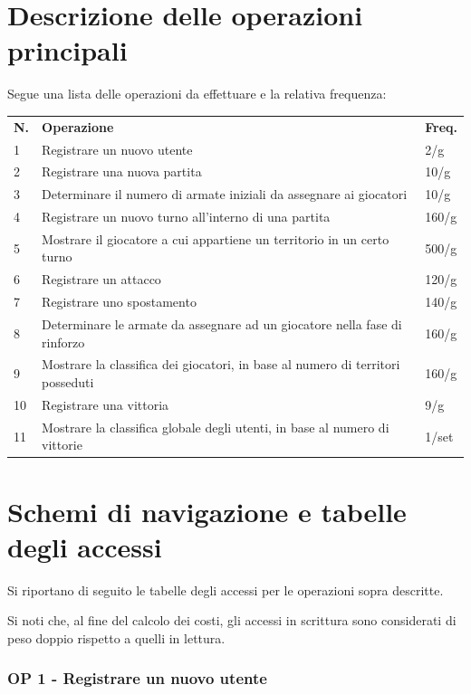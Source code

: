 \documentclass[a4paper,12pt]{report}
\begin{document}
\section{Descrizione delle operazioni principali}

Segue una lista delle operazioni da effettuare e la relativa frequenza:

\begin{table}[htbp]
    \begin{tabular}{lll}
        \rowcolor{lime!50} 
        \textbf{N.} & \textbf{Operazione} & \textbf{Freq.} \\
        1 & Registrare un nuovo utente & 2/g \\ 
        2 & Registrare una nuova partita & 10/g \\ 
        3 & Determinare il numero di armate iniziali da assegnare ai giocatori & 10/g \\ 
        4 & Registrare un nuovo turno all'interno di una partita & 160/g \\
        5 & Mostrare il giocatore a cui appartiene un territorio in un certo turno & 500/g \\ 
        6 & Registrare un attacco & 120/g \\ 
        7 & Registrare uno spostamento & 140/g \\ 
        8 & Determinare le armate da assegnare ad un giocatore nella fase di rinforzo & 160/g \\ 
        9 & Mostrare la classifica dei giocatori, in base al numero di territori posseduti & 160/g \\
        10 & Registrare una vittoria & 9/g \\
        11 & Mostrare la classifica globale degli utenti, in base al numero di vittorie & 1/set \\
    \end{tabular}
\end{table}

\section{Schemi di navigazione e tabelle degli accessi}

Si riportano di seguito le tabelle degli accessi per le operazioni sopra descritte. \par
Si noti che, al fine del calcolo dei costi, gli accessi in scrittura sono considerati di peso doppio rispetto a quelli in lettura.

\subsubsection{OP 1 - Registrare un nuovo utente}
\end{document}

